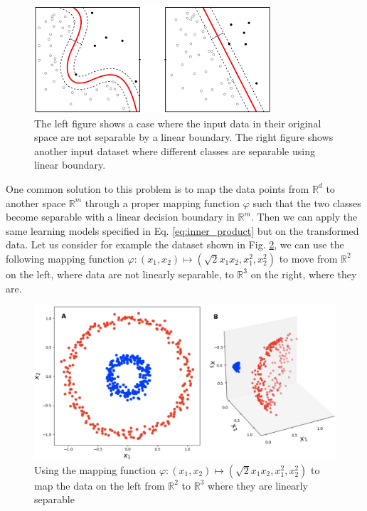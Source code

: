 \begin{figure}[t]
	\centering
	\includegraphics[scale=0.8]{figs/svm.png}
	\caption[The case where classes aren't separable using linear boundary]{The left figure shows a case where the input data in their original space are not separable by a linear boundary. The right figure shows another input dataset where different classes are separable using linear boundary. }
	\label{fig:SVM_boundaries}
\end{figure}

One common solution to this problem is to map the data points from $\mathbb{R}^d$ to another space $\mathbb{R}^m$  through a proper mapping function $\varphi$ such that the two classes become separable with a linear decision boundary in $\mathbb{R}^m$. Then we can apply the same learning models specified in Eq. \ref{eq:inner_product} but on the transformed data. Let us consider for example the dataset shown in Fig. \ref{fig:polynomial_kernel},  we can use the following mapping function $\varphi:(x_1,x_2)\mapsto (\sqrt{2}x_1x_2,x_1^2,x_2^2)$ to move from $\mathbb{R}^2$ on the left, where data are not linearly separable, to $\mathbb{R}^3$ on the right, where they are.

\begin{figure}[H]
	\centering
	\includegraphics[scale=0.25]{figs/poly_kenrnel.png}
	\caption[Lifting data to a higher-dimension space to get linearly separable classes]{ Using the mapping function $\varphi:(x_1,x_2)\mapsto (\sqrt{2}x_1x_2,x_1^2,x_2^2)$ to map the data on the left from $\mathbb{R}^2$ to $\mathbb{R}^3$ where they are linearly separable}
	\label{fig:polynomial_kernel}
\end{figure}

